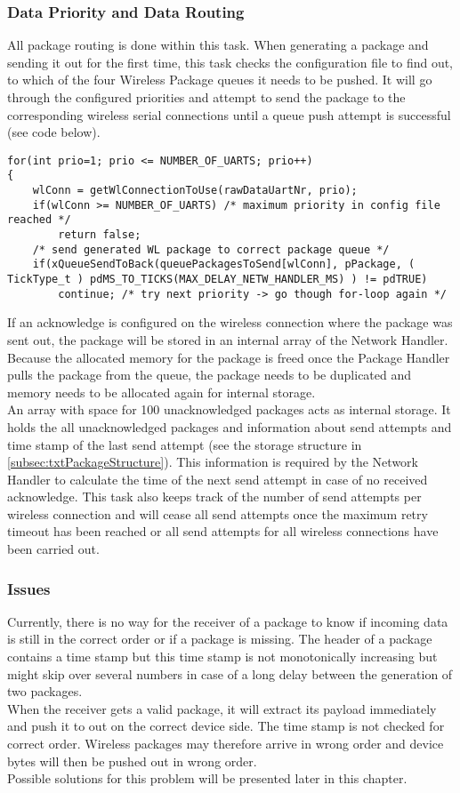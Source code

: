 \subsubsection{Data Priority and Data Routing}
All package routing is done within this task. When generating a package and sending it out for the first time, this task checks the configuration file to find out, to which of the four Wireless Package queues it needs to be pushed. It will go through the configured priorities and attempt to send the package to the corresponding wireless serial connections until a queue push attempt is successful (see code below).
\begin{lstlisting}
for(int prio=1; prio <= NUMBER_OF_UARTS; prio++)
{
    wlConn = getWlConnectionToUse(rawDataUartNr, prio);
    if(wlConn >= NUMBER_OF_UARTS) /* maximum priority in config file reached */
        return false;
    /* send generated WL package to correct package queue */
    if(xQueueSendToBack(queuePackagesToSend[wlConn], pPackage, ( TickType_t ) pdMS_TO_TICKS(MAX_DELAY_NETW_HANDLER_MS) ) != pdTRUE)
        continue; /* try next priority -> go though for-loop again */
\end{lstlisting}
If an acknowledge is configured on the wireless connection where the package was sent out, the package will be stored in an internal array of the Network Handler. Because the allocated memory for the package is freed once the Package Handler pulls the package from the queue, the package needs to be duplicated and memory needs to be allocated again for internal storage.\\
An array with space for 100 unacknowledged packages acts as internal storage. It holds the all unacknowledged packages and information about send attempts and time stamp of the last send attempt (see the storage structure in \autoref{subsec:txtPackageStructure}). This information is required by the Network Handler to calculate the time of the next send attempt in case of no received acknowledge. This task also keeps track of the number of send attempts per wireless connection and will cease all send attempts once the maximum retry timeout has been reached or all send attempts for all wireless connections have been carried out.
\subsubsection{Issues}
Currently, there is no way for the receiver of a package to know if incoming data is still in the correct order or if a package is missing. The header of a package contains a time stamp but this time stamp is not monotonically increasing but might skip over several numbers in case of a long delay between the generation of two packages.\\
When the receiver gets a valid package, it will extract its payload immediately and push it to out on the correct device side. The time stamp is not checked for correct order. Wireless packages may therefore arrive in wrong order and device bytes will then be pushed out in wrong order.\\
Possible solutions for this problem will be presented later in this chapter.\\
%
%
